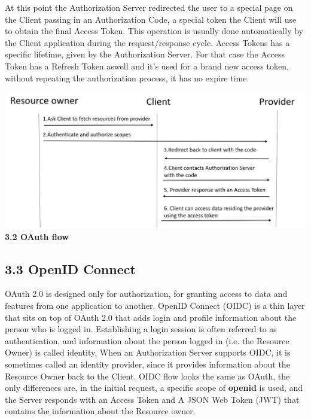 At this point the Authorization Server redirected the user to a special page on the Client passing in an Authorization Code, a special token the Client will use to obtain the final Access Token. This operation is usually done automatically by the Client application during the request/response cycle. Access Tokens has a specific lifetime, given by the Authorization Server. For that case the Access Token has a Refresh Token aswell and it's used for a brand new access token, without repeating the authorization process, it has no expire time.


\begin{center}
	\includegraphics[scale=0.3]{figures/oauth.png}\\
	\textcolor{OAUTH}{\textbf{3.2 OAuth flow}}
\end{center}


\subsection*{3.3 OpenID Connect}

OAuth 2.0 is designed only for authorization, for granting access to data and features from one application to another. OpenID Connect (OIDC) is a thin layer that sits on top of OAuth 2.0 that adds login and profile information about the person who is logged in. Establishing a login session is often referred to as authentication, and information about the person logged in (i.e. the Resource Owner) is called identity. When an Authorization Server supports OIDC, it is sometimes called an identity provider, since it provides information about the Resource Owner back to the Client. OIDC flow looks the same as OAuth, the only differences are, in the initial request, a specific scope of \textbf{openid} is used, and the Server responds with an Access Token and A JSON Web Token (JWT) that contains the information about the Resource owner.


